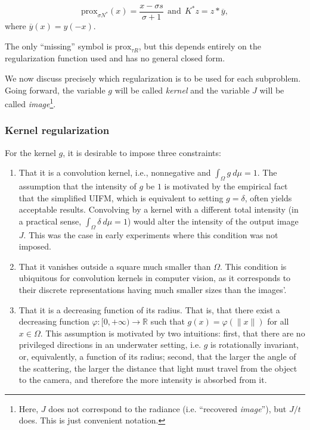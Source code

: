 \documentclass[twocolumn,twoside,a4paper,10pt]{IEEEtran}
\begin{document}
\begin{equation}\label{eq:primal-dual-analytical}
  \text{prox}_{\sigma N^*}(x) = \frac{x-\sigma s}{\sigma + 1} ~~ \text{and} ~~ K^*z = z\ast \overline{y},
\end{equation}
where \(\overline{y}(x) = y(-x)\).

The only ``missing'' symbol is \(\text{prox}_{\tau R}\), but this depends entirely on the regularization function used and has no general closed form.

We now discuss precisely which regularization is to be used for each subproblem. Going forward, the variable \(g\) will be called \textit{kernel} and the variable \(J\) will be called \textit{image}\footnote{Here, \(J\) does not correspond to the radiance (i.e. ``recovered \textit{image}''), but \(J/t\) does. This is just convenient notation.}.

\subsubsection{Kernel regularization}
For the kernel \(g\), it is desirable to impose three constraints:
\begin{enumerate}
  \item \label{kernel-regularization-1}That it is a convolution kernel, i.e., nonnegative and \(\int_{\Omega}g~d\mu = 1\). The assumption that the intensity of \(g\) be \(1\) is motivated by the empirical fact that the simplified UIFM, which is equivalent to setting \(g=\delta\), often yields acceptable results. Convolving by a kernel with a different total intensity (in a practical sense, \(\int_{\Omega}\delta~d\mu=1\)) would alter the intensity of the output image \(J\). This was the case in early experiments where this condition was not imposed.
  \item That it vanishes outside a square much smaller than \(\Omega\). This condition is ubiquitous for convolution kernels in computer vision, as it corresponds to their discrete representations having much smaller sizes than the images'.
  \item That it is a decreasing function of its radius. That is, that there exist a decreasing function \(\varphi\colon [0, +\infty)\to \mathbb{R}\) such that \(g(x)=\varphi(\|x\|)\) for all \(x\in\Omega\). This assumption is motivated by two intuitions: first, that there are no privileged directions in an underwater setting, i.e. \(g\) is rotationally invariant, or, equivalently, a function of its radius; second, that the larger the angle of the scattering, the larger the distance that light must travel from the object to the camera, and therefore the more intensity
  is absorbed from it.
\end{enumerate}
\end{document}
